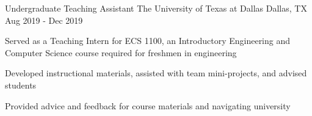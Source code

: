 \begin{cventries}
  \cventry
    {Undergraduate Teaching Assistant} %
    {The University of Texas at Dallas} %
    {Dallas, TX} %
    {Aug 2019 - Dec 2019} %
    {
      \begin{cvitems} %
        \item {Served as a Teaching Intern for ECS 1100, an Introductory Engineering and Computer Science course required for freshmen in engineering}
        \item {Developed instructional materials, assisted with team mini-projects, and advised students}
        \item {Provided advice and feedback for course materials and navigating university}
      \end{cvitems}
    }
    
\end{cventries}
